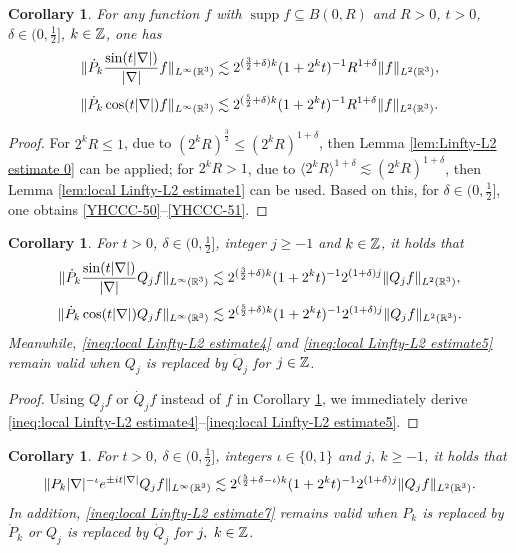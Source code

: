 \documentclass[11pt,twoside]{article}
\def\Z{\mathop{\mathbb Z\kern 0pt}\nolimits}
\def\R{\mathop{\mathbb R\kern 0pt}\nolimits}
\def\f{\frac}
\def\ls{\lesssim}
\newcommand{\w}[1]{\langle {#1} \rangle}
\newcommand{\pk}{\dot{P}_k}
\newcommand{\q}{\dot{Q}}
\DeclareMathOperator{\supp}{supp}
\theoremstyle{plain}
\newtheorem{cor}[theorem]{Corollary}
\theoremstyle{definition}
\numberwithin{equation}{section}
\begin{document}
	\begin{cor}\label{cor:local Linfty-L2 estimate2}
		For any function $f$ with $\supp f \subseteq B(0,R)$ and $R>0$, $t>0$, $\delta\in(0,\f12]$, $k\in \Z$, one has
		\begin{equation}\label{YHCCC-50}
			\|\pk\f{\sin(t|\nabla|)}{|\nabla|}f\|_{L^\infty(\R^3)} \ls 2^{(\f32+\delta) k}(1+2^kt)^{-1}  R^{1+\delta}\|f\|_{L^2(\R^3)},
		\end{equation}
		\begin{equation}\label{YHCCC-51}
			\|\pk\cos(t|\nabla|)f\|_{L^\infty(\R^3)} \ls 2^{(\f52+\delta) k}(1+2^kt)^{-1} R^{1+\delta}\|f\|_{L^2(\R^3)}.
		\end{equation}
	\end{cor}
	\begin{proof}
		For $2^k R \le 1$, due to $(2^k R)^{\f32}\le (2^k R)^{1+\delta}$, then Lemma \ref{lem:Linfty-L2 estimate 0} can be applied;
for $2^kR>1$, due to $\w{2^k R}^{1+\delta}\ls (2^k R)^{1+\delta}$, then  Lemma \ref{lem:local Linfty-L2 estimate1} can be used.
Based on this, for $\delta\in(0,\f12]$, one obtains \eqref{YHCCC-50}--\eqref{YHCCC-51}.
\end{proof}
	\begin{cor}\label{cor:local Linfty-L2 estimate3}
		For $t>0$, $\delta\in(0,\f12]$, integer $j\ge -1$ and $k\in \Z$, it holds that
		\begin{equation}\label{ineq:local Linfty-L2 estimate4}
			\|\dot{P}_{k}\f{\sin(t|\nabla|)}{|\nabla|}Q_j f\|_{L^\infty(\R^3)} \lesssim 2^{(\f32+\delta) k}(1+2^kt)^{-1} 2^{(1+\delta)j}\| Q_j f\|_{L^2(\R^3)},
		\end{equation}
		\begin{equation}\label{ineq:local Linfty-L2 estimate5}
			\|\dot{P}_{k}\cos(t|\nabla|)Q_j f\|_{L^\infty(\R^3)} \lesssim   2^{(\f52+\delta) k}(1+2^kt)^{-1} 2^{(1+\delta)j}\| Q_j f\|_{L^2(\R^3)}.
		\end{equation}
		Meanwhile, \eqref{ineq:local Linfty-L2 estimate4} and \eqref{ineq:local Linfty-L2 estimate5} remain valid when $Q_j$ is replaced by $\q_j$ for $j\in\Z$.
	\end{cor}
	\begin{proof}
	Using  $Q_j f$ or $\q_j f$ instead of $f$ in Corollary \ref{cor:local Linfty-L2 estimate2}, we immediately derive
 \eqref{ineq:local Linfty-L2 estimate4}--\eqref{ineq:local Linfty-L2 estimate5}.
	\end{proof}
	\begin{cor}\label{cor:2.10}
		For $t>0$, $\delta\in(0,\f12]$, integers $\iota\in\{0,1\}$ and $j,\ k\ge -1$, it holds that
			\begin{equation}\label{ineq:local Linfty-L2 estimate7}
				\|P_k|\nabla|^{-\iota}e^{\pm it|\nabla|}Q_j f\|_{L^\infty(\R^3)} \lesssim 2^{(\f52+\delta-\iota) k}(1+2^kt)^{-1} 2^{(1+\delta)j}\| Q_j f\|_{L^2(\R^3)}.
			\end{equation}
	In addition, \eqref{ineq:local Linfty-L2 estimate7} remains valid when $P_k$ is replaced by $\pk$ or $Q_j$ is replaced by $\q_j$ for $j,\ k\in\Z$.
	\end{cor}
\end{document}
